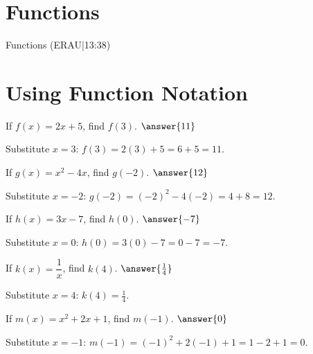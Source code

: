 \documentclass{ximera}
\begin{document}

\section*{Functions}

Functions (ERAU|13:38)



\section*{Using Function Notation}

\begin{problem}
If $f(x) = 2x + 5$, find $f(3)$. $\answer{11}$
\begin{feedback}
Substitute $x = 3$: $f(3) = 2(3) + 5 = 6 + 5 = 11$.
\end{feedback}
\end{problem}

\begin{problem}
If $g(x) = x^2 - 4x$, find $g(-2)$. $\answer{12}$
\begin{feedback}
Substitute $x = -2$: $g(-2) = (-2)^2 - 4(-2) = 4 + 8 = 12$.
\end{feedback}
\end{problem}

\begin{problem}
If $h(x) = 3x - 7$, find $h(0)$. $\answer{-7}$
\begin{feedback}
Substitute $x = 0$: $h(0) = 3(0) - 7 = 0 - 7 = -7$.
\end{feedback}
\end{problem}

\begin{problem}
If $k(x) = \dfrac{1}{x}$, find $k(4)$. $\answer{\frac{1}{4}}$
\begin{feedback}
Substitute $x = 4$: $k(4) = \frac{1}{4}$.
\end{feedback}
\end{problem}

\begin{problem}
If $m(x) = x^2 + 2x + 1$, find $m(-1)$. $\answer{0}$
\begin{feedback}
Substitute $x = -1$: $m(-1) = (-1)^2 + 2(-1) + 1 = 1 - 2 + 1 = 0$.
\end{feedback}
\end{problem}
\end{document}
